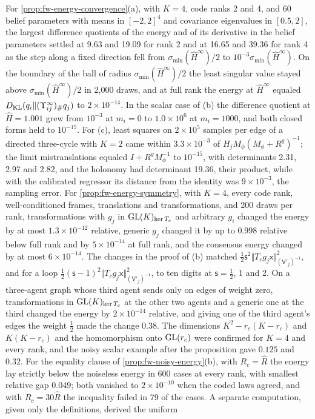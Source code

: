 \begin{numcheck}
\end{numcheck}

\begin{numcheck}\label{chk:fw-comm-energy-learning}
For \cref{prop:fw-energy-convergence}(a), with $K=4$, code ranks 2 and 4, and 60 belief parameters with means in $[-2,2]^4$ and covariance eigenvalues in $[0.5,2]$, the largest difference quotients of the energy and of its derivative in the belief parameters settled at 9.63 and 19.09 for rank 2 and at 16.65 and 39.36 for rank 4 as the step along a fixed direction fell from $\sigma_{\min}(\hat H^\infty)/2$ to $10^{-3}\sigma_{\min}(\hat H^\infty)$. On the boundary of the ball of radius $\sigma_{\min}(\hat H^\infty)/2$ the least singular value stayed above $\sigma_{\min}(\hat H^\infty)/2$ in 2,000 draws, and at full rank the energy at $\hat H^\infty$ equaled $D_{\mathrm{KL}}(q_i\Vert(\Upsilon^\infty_{ij})_\#q_j)$ to $2\times10^{-14}$. In the scalar case of (b) the difference quotient at $\hat H=1.001$ grew from $10^{-3}$ at $m_i=0$ to $1.0\times10^6$ at $m_i=1000$, and both closed forms held to $10^{-15}$. For (c), least squares on $2\times10^5$ samples per edge of a directed three-cycle with $K=2$ came within $3.3\times10^{-3}$ of $H_jM_\phi(M_\phi+R^g)^{-1}$; the limit mistranslations equaled $I+R^gM_\phi^{-1}$ to $10^{-15}$, with determinants 2.31, 2.97 and 2.82, and the holonomy had determinant 19.36, their product, while with the calibrated regressor its distance from the identity was $9\times10^{-3}$, the sampling error. For \cref{prop:fw-energy-symmetry}, with $K=4$, every code rank, well-conditioned frames, translations and transformations, and 200 draws per rank, transformations with $g_j$ in $\mathrm{GL}(K)_{\ker T_c}$ and arbitrary $g_i$ changed the energy by at most $1.3\times10^{-12}$ relative, generic $g_j$ changed it by up to $0.998$ relative below full rank and by $5\times10^{-14}$ at full rank, and the consensus energy changed by at most $6\times10^{-14}$. The changes in the proof of (b) matched $\tfrac12\mathsf s^2\Vert T_cg_j\mathsf x\Vert^2_{(\mathsf V'_j)^{-1}}$, and for a loop $\tfrac12(\mathsf s-1)^2\Vert T_cg_j\mathsf x\Vert^2_{(\mathsf V'_j)^{-1}}$, to ten digits at $\mathsf s=\tfrac12$, 1 and 2. On a three-agent graph whose third agent sends only on edges of weight zero, transformations in $\mathrm{GL}(K)_{\ker T_c}$ at the other two agents and a generic one at the third changed the energy by $2\times10^{-14}$ relative, and giving one of the third agent's edges the weight $\tfrac12$ made the change $0.38$. The dimensions $K^2-r_c(K-r_c)$ and $K(K-r_c)$ and the homomorphism onto $\mathrm{GL}(r_c)$ were confirmed for $K=4$ and every rank, and the noisy scalar example after the proposition gave $0.125$ and $0.32$. For the equality clause of \cref{prop:fw-noisy-energy}(b), with $R_c=\hat R$ the energy lay strictly below the noiseless energy in 600 cases at every rank, with smallest relative gap $0.049$; both vanished to $2\times10^{-10}$ when the coded laws agreed, and with $R_c=30\hat R$ the inequality failed in 79 of the cases. A separate computation, given only the definitions, derived the uniform 
\end{numcheck}
